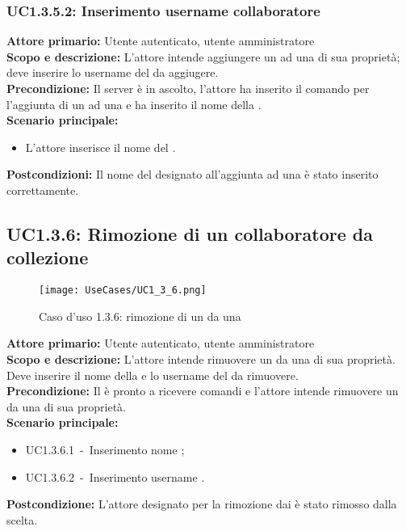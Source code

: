 \documentclass{scalatekids-article}
\begin{document}
\subsubsection{UC1.3.5.2: Inserimento username collaboratore}

\textbf{Attore primario:} Utente autenticato, utente amministratore\\
\textbf{Scopo e descrizione:} L'attore intende aggiungere un  ad una  di sua proprietà; deve inserire lo username del  da aggiugere.\\
\textbf{Precondizione:} Il server è in ascolto, l'attore ha inserito il comando per l'aggiunta di un  ad una  e ha inserito il nome della .\\
\textbf{Scenario principale:}
\begin{itemize}
\item L'attore inserisce il nome del .
\end{itemize}
\textbf{Postcondizioni:} Il nome del  designato all'aggiunta ad una  è stato inserito correttamente.

\subsection{UC1.3.6: Rimozione di un collaboratore da collezione}
\begin{figure}[H]
  \begin{center}
    \texttt{[image: UseCases/UC1\_3\_6.png]}
    \caption*{Caso d'uso 1.3.6: rimozione di un  da una }
  \end{center}
\end{figure}
\textbf{Attore primario:} Utente autenticato, utente amministratore\\
\textbf{Scopo e descrizione:} L'attore intende rimuovere un  da una  di sua proprietà. Deve inserire il nome della  e lo username del  da rimuovere.\\
\textbf{Precondizione:} Il  è pronto a ricevere comandi e l'attore intende rimuovere un  da una  di sua proprietà.\\
\textbf{Scenario principale:}
\begin{itemize}
\item UC1.3.6.1\ -\ Inserimento nome ;
\item UC1.3.6.2\ -\ Inserimento username .
\end{itemize}
\textbf{Postcondizione:} L'attore designato per la rimozione dai  è stato rimosso dalla  scelta.
\end{document}
